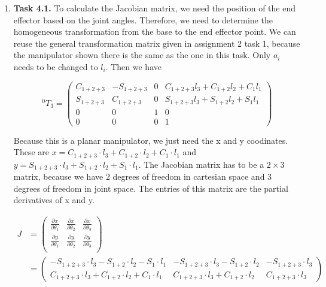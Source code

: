 \documentclass[a4paper,11pt]{article}
\author{\authorinfo}
\title{\titleinfo}
\date{\today}
\begin{document}
\maketitle
\begin {enumerate}
	\item[\textbf{Task 4.1.}]
		To calculate the Jacobian matrix, we need the position of the end effector based on the joint angles. Therefore, we need to determine the homogeneous transformation from the base to the end effector point. We can reuse the general transformation matrix given in assignment 2 task 1, because the manipulator shown there is the same as the one in this task. Only $a_i$ needs to be changed to $l_i$. Then we have
		
		$${^{0}T_3} = \begin{pmatrix}
			C_{1+2+3} & -S_{1+2+3} & 0 & C_{1+2+3}l_3 + C_{1+2}l_2+C_1l_1\\
			S_{1+2+3} & C_{1+2+3} & 0 & S_{1+2+3}l_3 + S_{1+2}l_2 + S_1l_1\\
			0 & 0 & 1 & 0\\
			0 & 0 & 0 & 1
		\end{pmatrix}$$
		
		Because this is a planar manipulator, we just need the x and y coodinates. These are $x = C_{1+2+3} \cdot l_3 + C_{1+2} \cdot l_2 + C_1 \cdot l_1$ and $y = S_{1+2+3} \cdot l_3 + S_{1+2} \cdot l_2 + S_1 \cdot l_1$. The Jacobian matrix has to be a $2 \times 3$ matrix, because we have 2 degrees of freedom in cartesian space and 3 degrees of freedom in joint space. The entries of this matrix are the partial derivatives of x and y.
		
		\begin{align*}
			J &= \begin{pmatrix}
				\frac{\partial x}{\partial \theta_1} & \frac{\partial x}{\partial \theta_2} & \frac{\partial x}{\partial \theta_3} \\[6pt]
				\frac{\partial y}{\partial \theta_1} & \frac{\partial y}{\partial \theta_2} & \frac{\partial y}{\partial \theta_3} \\
			\end{pmatrix}\\
			&= \begin{pmatrix}
				-S_{1+2+3} \cdot l_3 - S_{1+2} \cdot l_2 - S_1 \cdot l_1 & -S_{1+2+3} \cdot l_3 - S_{1+2} \cdot l_2 & -S_{1+2+3} \cdot l_3\\
				C_{1+2+3} \cdot l_3 + C_{1+2} \cdot l_2 + C_1 \cdot l_1 & C_{1+2+3} \cdot l_3 + C_{1+2} \cdot l_2 & C_{1+2+3} \cdot l_3
			\end{pmatrix}\\
		\end{align*}
		

\end{enumerate}
\end{document}
